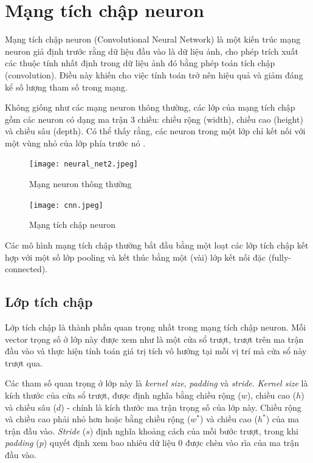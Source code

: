 \documentclass[../thesis.tex]{subfiles}
\begin{document}
\section{Mạng tích chập neuron}

Mạng tích chập neuron (Convolutional Neural Network) là một kiến trúc mạng neuron giả định trước rằng dữ liệu đầu vào là dữ liệu ảnh, cho phép trích xuất các thuộc tính nhất định trong dữ liệu ảnh đó bằng phép toán tích chập (convolution). Điều này khiến cho việc tính toán trở nên hiệu quả và giảm đáng kể số lượng tham số trong mạng.

Không giống như các mạng neuron thông thường, các lớp của mạng tích chập gồm các neuron có dạng ma trận 3 chiều: chiều rộng (width), chiều cao (height) và chiều sâu (depth). Có thể thấy rằng, các neuron trong một lớp chỉ kết nối với một vùng nhỏ của lớp phía trước nó \cite{cs231n}.

\begin{figure}[H]
    \begin{minipage}{0.48\textwidth}
        \centering
        \texttt{[image: neural\_net2.jpeg]}
        \caption{Mạng neuron thông thường}\label{Fig:NN}
    \end{minipage}\hfill
        \begin {minipage}{0.48\textwidth}
        \centering
        \texttt{[image: cnn.jpeg]}
        \caption{Mạng tích chập neuron}\label{Fig:CNN}
    \end{minipage}
\end{figure}

Các mô hình mạng tích chập thường bắt đầu bằng một loạt các lớp tích chập kết hợp với một số lớp pooling và kết thúc bằng một (vài) lớp kết nối đặc (fully-connected).


\subsection{Lớp tích chập} 

Lớp tích chập là thành phần quan trọng nhất trong mạng tích chập neuron. Mỗi vector trọng số ở lớp này được xem như là một cửa sổ trượt, trượt trên ma trận đầu vào và thực hiện tính toán giá trị tích vô hướng tại mỗi vị trí mà cửa sổ này trượt qua. 

Các tham số quan trọng ở lớp này là \textit{kernel size}, \textit{padding} và \textit{stride}. \textit{Kernel size} là kích thước của cửa sổ trượt, được định nghĩa bằng chiều rộng ($w$), chiều cao ($h$) và chiều sâu ($d$) - chính là kích thước ma trận trọng số của lớp này. Chiều rộng và chiều cao phải nhỏ hơn hoặc bằng chiều rộng ($w^*$) và chiều cao ($h^*$) của ma trận đầu vào. \textit{Stride} ($s$) định nghĩa khoảng cách của mỗi bước trượt, trong khi \textit{padding} ($p$) quyết định xem bao nhiêu dữ liệu 0 được chèn vào rìa của ma trận đầu vào. 
\end{document}
